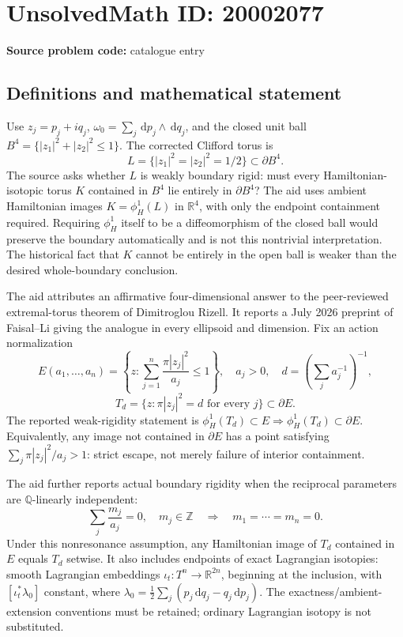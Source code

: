 \documentclass[11pt]{article}
\newcommand{\Z}{\mathbb{Z}}
\newcommand{\Q}{\mathbb{Q}}
\newcommand{\R}{\mathbb{R}}
\newcommand{\dd}{\,\mathrm{d}}
\begin{document}
\section*{UnsolvedMath ID: 20002077}
\textbf{Source problem code:} catalogue entry
\subsection{Definitions and mathematical statement}
Use \(z_j=p_j+iq_j\), \(\omega_0=\sum_j\dd p_j\wedge\dd q_j\), and the closed unit ball \(B^4=\{|z_1|^2+|z_2|^2\leq1\}\). The corrected Clifford torus is
\[
L=\{|z_1|^2=|z_2|^2=1/2\}\subset\partial B^4.
\]
The source asks whether \(L\) is weakly boundary rigid: must every Hamiltonian-isotopic torus \(K\) contained in \(B^4\) lie entirely in \(\partial B^4\)? The aid uses ambient Hamiltonian images \(K=\phi_H^1(L)\) in \(\R^4\), with only the endpoint containment required. Requiring \(\phi_H^1\) itself to be a diffeomorphism of the closed ball would preserve the boundary automatically and is not this nontrivial interpretation. The historical fact that \(K\) cannot be entirely in the open ball is weaker than the desired whole-boundary conclusion.

The aid attributes an affirmative four-dimensional answer to the peer-reviewed extremal-torus theorem of Dimitroglou Rizell. It reports a July 2026 preprint of Faisal--Li giving the analogue in every ellipsoid and dimension. Fix an action normalization
\[
E(a_1,\ldots,a_n)=\left\{z:\sum_{j=1}^n\frac{\pi|z_j|^2}{a_j}\leq1\right\},\quad a_j>0,
\quad d=\left(\sum_ja_j^{-1}\right)^{-1},
\]
\[
T_d=\{z:\pi|z_j|^2=d\text{ for every }j\}\subset\partial E.
\]
The reported weak-rigidity statement is \(\phi_H^1(T_d)\subset E\Rightarrow\phi_H^1(T_d)\subset\partial E\). Equivalently, any image not contained in \(\partial E\) has a point satisfying \(\sum_j\pi|z_j|^2/a_j>1\): strict escape, not merely failure of interior containment.

The aid further reports actual boundary rigidity when the reciprocal parameters are \(\Q\)-linearly independent:
\[
\sum_j\frac{m_j}{a_j}=0,\quad m_j\in\Z
\quad\Longrightarrow\quad m_1=\cdots=m_n=0.
\]
Under this nonresonance assumption, any Hamiltonian image of \(T_d\) contained in \(E\) equals \(T_d\) setwise. It also includes endpoints of exact Lagrangian isotopies: smooth Lagrangian embeddings \(\iota_t:T^n\to\R^{2n}\), beginning at the inclusion, with \([\iota_t^*\lambda_0]\) constant, where \(\lambda_0=\tfrac12\sum_j(p_j\dd q_j-q_j\dd p_j)\). The exactness/ambient-extension conventions must be retained; ordinary Lagrangian isotopy is not substituted.
\end{document}
